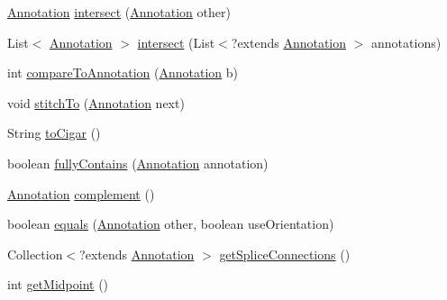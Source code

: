 \begin{DoxyCompactItemize}
\item 
\hyperlink{interfaceumms_1_1core_1_1annotation_1_1_annotation}{Annotation} \hyperlink{interfaceumms_1_1core_1_1annotation_1_1_annotation_a3c009278c52746db8adece1e2f7f5d49}{intersect} (\hyperlink{interfaceumms_1_1core_1_1annotation_1_1_annotation}{Annotation} other)
\item 
List$<$ \hyperlink{interfaceumms_1_1core_1_1annotation_1_1_annotation}{Annotation} $>$ \hyperlink{interfaceumms_1_1core_1_1annotation_1_1_annotation_a0734440cf08dab0a83fd2fac5a1f920c}{intersect} (List$<$?extends \hyperlink{interfaceumms_1_1core_1_1annotation_1_1_annotation}{Annotation} $>$ annotations)
\item 
int \hyperlink{interfaceumms_1_1core_1_1annotation_1_1_annotation_ad31140b58428e5ceb60d15118d1a1a28}{compare\+To\+Annotation} (\hyperlink{interfaceumms_1_1core_1_1annotation_1_1_annotation}{Annotation} b)
\item 
void \hyperlink{interfaceumms_1_1core_1_1annotation_1_1_annotation_ae3d90b1fa243bbd4a39e95c9ada67f65}{stitch\+To} (\hyperlink{interfaceumms_1_1core_1_1annotation_1_1_annotation}{Annotation} next)
\item 
String \hyperlink{interfaceumms_1_1core_1_1annotation_1_1_annotation_a23c41e6ebdec522b123bdb4ee2ea7b04}{to\+Cigar} ()
\item 
boolean \hyperlink{interfaceumms_1_1core_1_1annotation_1_1_annotation_a8a750c3d4650b0c450622bbb04b203d2}{fully\+Contains} (\hyperlink{interfaceumms_1_1core_1_1annotation_1_1_annotation}{Annotation} annotation)
\item 
\hyperlink{interfaceumms_1_1core_1_1annotation_1_1_annotation}{Annotation} \hyperlink{interfaceumms_1_1core_1_1annotation_1_1_annotation_a0c9c81ea4fbb301fc88aea73a98e5d53}{complement} ()
\item 
boolean \hyperlink{interfaceumms_1_1core_1_1annotation_1_1_annotation_acbab7da90fcaf63d8fc5ae7fdf16124a}{equals} (\hyperlink{interfaceumms_1_1core_1_1annotation_1_1_annotation}{Annotation} other, boolean use\+Orientation)
\item 
Collection$<$?extends \hyperlink{interfaceumms_1_1core_1_1annotation_1_1_annotation}{Annotation} $>$ \hyperlink{interfaceumms_1_1core_1_1annotation_1_1_annotation_a87f320553683b507e84278eb03ccacdb}{get\+Splice\+Connections} ()
\item 
int \hyperlink{interfaceumms_1_1core_1_1annotation_1_1_annotation_afae7bf9cbe54b2703f8f633d1fc1936c}{get\+Midpoint} ()
\end{DoxyCompactItemize}



